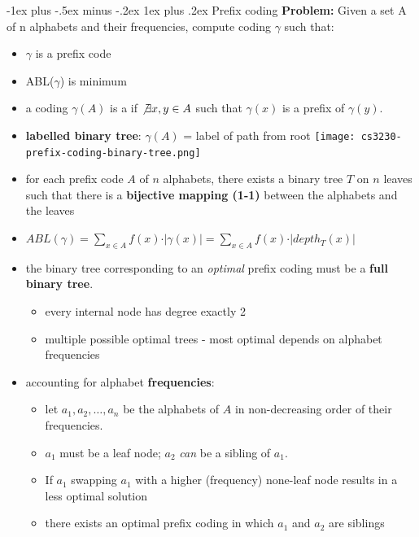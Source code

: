 \documentclass[10pt, landscape]{article}
\makeatletter
\renewcommand{\subsubsection}{\@startsection{subsubsection}{3}{0mm}%
  {-1ex plus -.5ex minus -.2ex}%
  {1ex plus .2ex}%
{\normalfont\small\bfseries}}%
\makeatother
\begin{document}
\begin{multicols*}{4}
  \subsubsection{Prefix coding}
  \textbf{Problem:} Given a set A of n alphabets and their frequencies, compute coding $\gamma$ such that:\\
  \begin{itemize}
    \item $\gamma$ is a prefix code
    \item ABL($\gamma$) is minimum
  \end{itemize}
  \begin{itemize}
    \item a coding $\gamma(A)$ is a  if $\not\exists x, y \in A$ such that $\gamma(x)$ is a prefix of $\gamma(y)$.
    \item \textbf{labelled binary tree}: $\gamma(A)$ = label of path from root
      \texttt{[image: cs3230-prefix-coding-binary-tree.png]} 
    \item for each prefix code $A$ of $n$ alphabets, there exists a binary tree $T$ on $n$ leaves such that there is a \textbf{bijective mapping (1-1)} between the alphabets and the leaves
    \item $ABL(\gamma) = \sum\limits_{x \in A} f(x) \cdot \vert \gamma(x) \vert = \sum\limits_{x \in A} f(x) \cdot \vert depth_T (x) \vert$
    \item the binary tree corresponding to an \textit{optimal} prefix coding must be a \textbf{full binary tree}.
      \begin{itemize}
        \item every internal node has degree exactly 2
        \item multiple possible optimal trees - most optimal depends on alphabet frequencies
      \end{itemize}
    \item accounting for alphabet \textbf{frequencies}:
      \begin{itemize}
        \item let $a_1, a_2, \dots, a_n$ be the alphabets of $A$ in non-decreasing order of their frequencies.
        \item $a_1$ must be a leaf node; $a_2$ \textit{can} be a sibling of $a_1$.
        \item If $a_1$ swapping $a_1$ with a higher (frequency) none-leaf node results in a less optimal solution
        \item there exists an optimal prefix coding in which $a_1$ and $a_2$ are siblings
      \end{itemize}


\end{itemize}
\end{multicols*}
\end{document}
